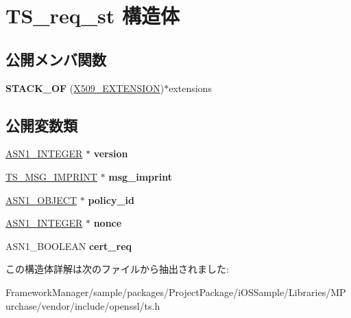 \hypertarget{struct_t_s__req__st}{}\section{T\+S\+\_\+req\+\_\+st 構造体}
\label{struct_t_s__req__st}
\subsection*{公開メンバ関数}
\begin{DoxyCompactItemize}
\item 
\hypertarget{struct_t_s__req__st_ae950d4f564b7e7c10e971168d32fcb9f}{}{\bfseries S\+T\+A\+C\+K\+\_\+\+O\+F} (\hyperlink{struct_x509__extension__st}{X509\+\_\+\+E\+X\+T\+E\+N\+S\+I\+O\+N})$\ast$extensions\label{struct_t_s__req__st_ae950d4f564b7e7c10e971168d32fcb9f}

\end{DoxyCompactItemize}
\subsection*{公開変数類}
\begin{DoxyCompactItemize}
\item 
\hypertarget{struct_t_s__req__st_aa404dd344baaf8d45b951fb6818e0ea6}{}\hyperlink{structasn1__string__st}{A\+S\+N1\+\_\+\+I\+N\+T\+E\+G\+E\+R} $\ast$ {\bfseries version}\label{struct_t_s__req__st_aa404dd344baaf8d45b951fb6818e0ea6}

\item 
\hypertarget{struct_t_s__req__st_a67ac68f0ed40b4230451fecd2e792697}{}\hyperlink{struct_t_s__msg__imprint__st}{T\+S\+\_\+\+M\+S\+G\+\_\+\+I\+M\+P\+R\+I\+N\+T} $\ast$ {\bfseries msg\+\_\+imprint}\label{struct_t_s__req__st_a67ac68f0ed40b4230451fecd2e792697}

\item 
\hypertarget{struct_t_s__req__st_a11bdc5b6a551d6e36046fbac834ffc83}{}\hyperlink{structasn1__object__st}{A\+S\+N1\+\_\+\+O\+B\+J\+E\+C\+T} $\ast$ {\bfseries policy\+\_\+id}\label{struct_t_s__req__st_a11bdc5b6a551d6e36046fbac834ffc83}

\item 
\hypertarget{struct_t_s__req__st_ad18dbde081c6d4caf09b5a6bce093221}{}\hyperlink{structasn1__string__st}{A\+S\+N1\+\_\+\+I\+N\+T\+E\+G\+E\+R} $\ast$ {\bfseries nonce}\label{struct_t_s__req__st_ad18dbde081c6d4caf09b5a6bce093221}

\item 
\hypertarget{struct_t_s__req__st_a9be51acb28db78bc8584e5a51e03be59}{}A\+S\+N1\+\_\+\+B\+O\+O\+L\+E\+A\+N {\bfseries cert\+\_\+req}\label{struct_t_s__req__st_a9be51acb28db78bc8584e5a51e03be59}

\end{DoxyCompactItemize}


この構造体詳解は次のファイルから抽出されました\+:\begin{DoxyCompactItemize}
\item 
Framework\+Manager/sample/packages/\+Project\+Package/i\+O\+S\+Sample/\+Libraries/\+M\+Purchase/vendor/include/openssl/ts.\+h\end{DoxyCompactItemize}

